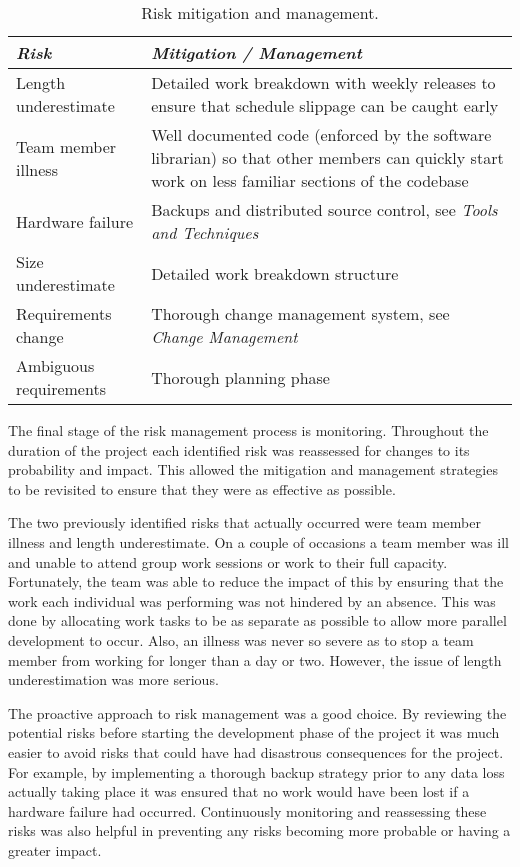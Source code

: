 \begin{table*}
	\small
	\begin{tabular}{l p{37em}}
		\toprule
		\emph{Risk} & \emph{Mitigation / Management} \\
		\midrule
		Length underestimate & Detailed work breakdown with weekly releases to ensure that
			schedule slippage can be caught early \\
		Team member illness & Well documented code (enforced by the software librarian) so
			that other members can quickly start work on less familiar sections of
			the codebase \\
		Hardware failure & Backups and distributed source control, see \emph{Tools and Techniques} \\ %
		Size underestimate & Detailed work breakdown structure \\
		Requirements change & Thorough change management system, see \emph{Change Management} \\ %
		Ambiguous requirements & Thorough planning phase \\
		\bottomrule
	\end{tabular}
	\vspace{1.5em}
	\caption{Risk mitigation and management.}
	\label{tab:rmm}
\end{table*}
 
The final stage of the risk management process is monitoring. Throughout the duration of
the project each identified risk was reassessed for changes to its probability and
impact. This allowed the mitigation and management strategies to be revisited to ensure that
they were as effective as possible.
 
The two previously identified risks that actually occurred were team member illness and length underestimate.
On a couple of occasions a team member was ill and unable to attend group work sessions or work to their full
capacity. Fortunately, the team was able to reduce the impact of this by ensuring that the work each individual
was performing was not hindered by an absence. This was done by allocating work tasks to be as separate as
possible to allow more parallel development to occur. Also, an illness was never so severe as to stop a team
member from working for longer than a day or two. However, the issue of length underestimation was more serious.
 
%
 
The proactive approach to risk management was a good choice. By reviewing the potential
risks before starting the development phase of the project it was much easier to avoid risks that could
have had disastrous consequences for the project. For example, by implementing a thorough backup strategy
prior to any data loss actually taking place it was ensured that no work would have been lost if a hardware
failure had occurred. Continuously monitoring and reassessing these risks was also helpful in preventing
any risks becoming more probable or having a greater impact.